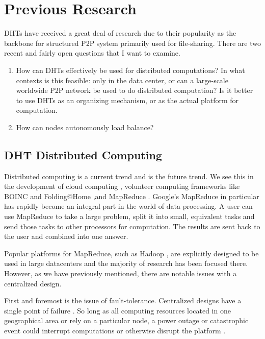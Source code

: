 \chapter{Previous Research}
\label{chapter:prev}


DHTs have received a great deal of research due to their popularity as the backbone for structured P2P system primarily used for file-sharing.
There are two recent and fairly open questions that I want to examine.

\begin{enumerate}
	\item How can DHTs effectively be used for distributed computations?  
	In what contexts is this feasible:  only in the data center, or can a large-scale worldwide P2P network be used to do distributed computation?
	Is it better to use DHTs as an organizing mechanism, or as the actual platform for computation.
	\item How can nodes autonomously load balance?
\end{enumerate}


\section{DHT Distributed Computing}
Distributed computing is a current trend and is the future trend.
We see this in the development of cloud computing \cite{p2p-cloud}, volunteer computing frameworks like BOINC \cite{anderson2004boinc} and Folding@Home \cite{larson2002folding},and MapReduce  \cite{mapreduce}.
Google's MapReduce  in particular has rapidly become an integral part in the world of data processing.  
A user can use MapReduce to take a large problem, split it into small, equivalent tasks and send those tasks to other processors for computation.  
The results are sent back to the user and combined into one answer. 

Popular platforms for MapReduce, such as Hadoop \cite{hadoop}  \cite{shvachko2010hadoop}, are explicitly designed to be used in large datacenters \cite{hadoopAssumptions} and the majority of research has been focused there.  
However, as we have previously mentioned, there are notable issues with a centralized design.

First and foremost is the issue of fault-tolerance.
Centralized designs have a single point of failure \cite{shvachko2010hadoop}.
So long as all computing resources located in one geographical area or rely on a particular node, a power outage or catastrophic event could interrupt computations or otherwise disrupt the platform \cite{babaoglu2014people}.

